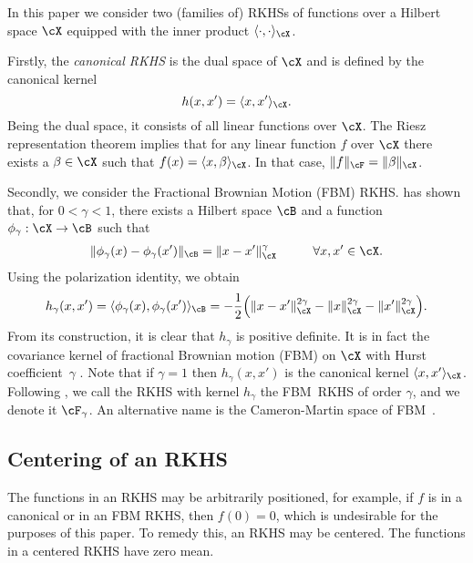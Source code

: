 \documentclass[preprint,12pt,authoryear]{elsarticle}
\DeclarePairedDelimiter{\norm}{\lVert}{\rVert}
\newcommand{\fbm}{{FBM}}
\newcommand{\inn}{\langle\cdot ,\cdot\rangle}
\begin{document}
In this paper we consider two (families of) RKHSs of functions over a Hilbert space $\cX$ equipped with the inner product $\inn_\cX$. 

Firstly, the {\em canonical RKHS} is the dual space of $\cX$ and is defined by the canonical kernel
\[  h(x,x') = \langle x,x'\rangle_\cX. \]
Being the dual space, it consists of all linear functions over $\cX$. The Riesz representation theorem implies that for any linear function $f$ over $\cX$ there exists a $\beta\in\cX$ such that $f(x)=\langle x,\beta\rangle_\cX$. In that case, $\norm{f}_\cF=\norm{\beta}_\cX$. 

Secondly, we consider the Fractional Brownian Motion (FBM) RKHS.
\citet{schoenberg37} has shown that, for $0<\gamma<1$, there exists a Hilbert space $\cB$ and a function $\phi_\gamma:\cX\rightarrow\cB$ such that
\begin{eqnarray}\label{emb}
\norm{\phi_{\gamma}(x)-\phi_{\gamma}(x')}_\cB = \norm{x-x'}_\cX^{\gamma} \hspace{10mm}\forall x,x'\in\cX.
\end{eqnarray}
Using the polarization identity, we obtain
\begin{eqnarray}\label{fbm}
h_{\gamma}(x,x') = \langle\phi_\gamma(x),\phi_\gamma(x')\rangle_\cB = -\frac12\Big(\norm{x-x'}_\cX^{2\gamma}-\norm{x}_\cX^{2\gamma}-\norm{x'}_\cX^{2\gamma}\Big).
\end{eqnarray}
From its construction, it is clear that $h_\gamma$ is positive definite. It is in fact the covariance kernel of fractional Brownian motion (\fbm) on $\cX$ with Hurst coefficient~$\gamma$ \citep{kolmogorov40wiener,mn68}.
Note that if $\gamma=1$ then $h_\gamma(x,x')$ is the canonical kernel $\langle x,x'\rangle_\cX$.
Following \citet{cohen02}, we call the RKHS with kernel $h_\gamma$ the \fbm\ RKHS of order $\gamma$, and we denote it $\cF_\gamma$. An alternative name is the Cameron-Martin space of \fbm\ \citep[see, e.g.][]{picard11}.


\subsection{Centering of an RKHS}\label{sec-cent}

The functions in an RKHS may be arbitrarily positioned, for example, if $f$ is in a canonical or in an FBM RKHS, then $f(0)=0$, which is undesirable for the purposes of this paper. To remedy this, an RKHS may be centered. The functions in a centered RKHS have zero mean. 
\end{document}
